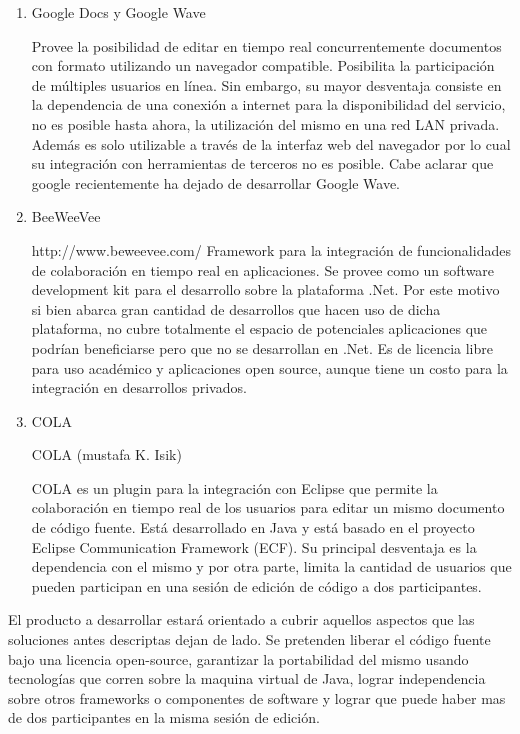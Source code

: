 \documentclass[12pt,a4paper]{article}
\begin{document}
	
	\begin{enumerate}
\item Google Docs y Google Wave

Provee la posibilidad de editar en tiempo real concurrentemente documentos con formato utilizando un navegador compatible. Posibilita la participación de múltiples usuarios en línea. Sin embargo, su mayor desventaja consiste en la dependencia de una conexión a internet para la disponibilidad del servicio, no es posible hasta ahora, la utilización del mismo en una red LAN privada. Además es solo utilizable a través de la interfaz web del navegador por lo cual su integración con herramientas de terceros no es posible. Cabe aclarar que google recientemente ha dejado de desarrollar Google Wave.



		\item BeeWeeVee

http://www.beweevee.com/
Framework para la integración de funcionalidades de colaboración en tiempo real en aplicaciones. Se provee como un software development kit para el desarrollo sobre la plataforma .Net. Por este motivo si bien abarca gran cantidad de desarrollos que hacen uso de dicha plataforma, no cubre totalmente el espacio de potenciales aplicaciones que podrían beneficiarse pero que no se desarrollan en .Net. Es de licencia libre para uso académico y aplicaciones open source, aunque tiene un costo para la integración en desarrollos privados.

		\item COLA
		
COLA (mustafa K. Isik)

COLA es un plugin para la integración con Eclipse que permite la colaboración en tiempo real de los usuarios para editar un mismo documento de código fuente. Está desarrollado en Java y está basado en el proyecto Eclipse Communication Framework (ECF). Su principal desventaja es la dependencia con el mismo y por otra parte, limita la cantidad de usuarios que pueden participan en una sesión de edición de código a dos participantes.
	\end{enumerate}
		
		
	


El producto a desarrollar estará orientado a cubrir aquellos aspectos que las soluciones antes descriptas dejan de lado. Se pretenden liberar el código fuente bajo una licencia open-source, garantizar la portabilidad del mismo usando tecnologías que corren sobre la maquina virtual de Java, lograr independencia sobre otros frameworks o componentes de software y lograr que puede haber mas de dos participantes en la misma sesión de edición.
\end{document}
